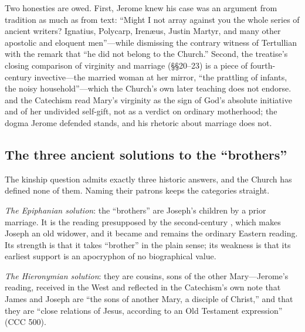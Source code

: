 Two honesties are owed. First, Jerome knew his case was an argument from
tradition as much as from text: ``Might I not array against you the whole
series of ancient writers? Ignatius, Polycarp, Iren\ae us, Justin Martyr,
and many other apostolic and eloquent men''---while dismissing the
contrary witness of Tertullian with the remark that ``he did not belong
to the Church.'' Second, the treatise's closing
comparison of virginity and marriage (\S\S20--23) is a piece of
fourth-century invective---the married woman at her mirror, ``the
prattling of infants, the noisy household''---which the Church's own
later teaching does not endorse.  and the Catechism
read Mary's virginity as the sign of God's absolute initiative and of her
undivided self-gift, not as a verdict on ordinary motherhood; the dogma
Jerome defended stands, and his rhetoric about marriage does not.

\subsection*{The three ancient solutions to the ``brothers''}

The kinship question admits exactly three historic answers, and the
Church has defined none of them. Naming their patrons keeps the
categories straight.

\emph{The Epiphanian solution}: the ``brothers'' are Joseph's children by
a prior marriage. It is the reading presupposed by the second-century
, which makes Joseph an old widower, and it
became and remains the ordinary Eastern reading. Its strength is that it
takes ``brother'' in the plain sense; its weakness is that its earliest
support is an apocryphon of no biographical value.

\emph{The Hieronymian solution}: they are cousins, sons of the other
Mary---Jerome's reading, received in the West and reflected in the
Catechism's own note that James and Joseph are ``the sons of another
Mary, a disciple of Christ,'' and that they are ``close relations of
Jesus, according to an Old Testament expression'' (CCC
500).

